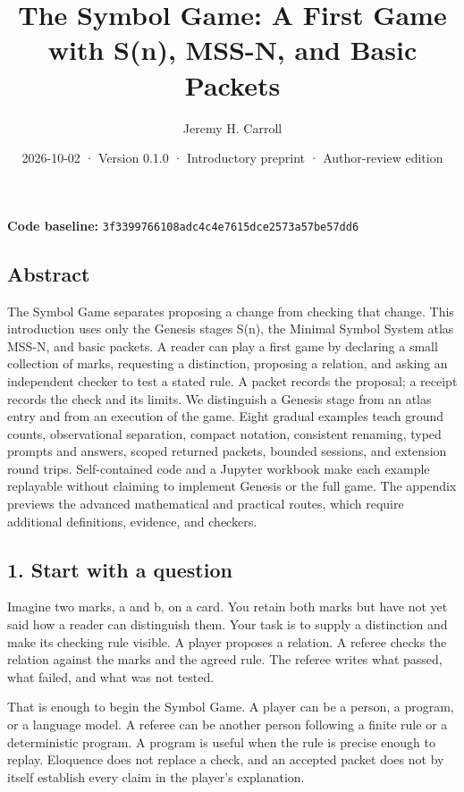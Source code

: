 \documentclass[
  11pt,
]{article}
\title{The Symbol Game: A First Game with S(n), MSS-N, and Basic
Packets}
\author{Jeremy H. Carroll}
\date{2026-10-02 · Version 0.1.0 · Introductory preprint · Author-review
edition}
\begin{document}
\makeatletter
\begin{center}
{\LARGE \@title\par}
\vspace{0.8em}
{\normalsize \@author\par}
\vspace{0.5em}
{\small \@date\par}
\end{center}
\makeatother

\textbf{Code baseline:}
\nolinkurl{3f3399766108adc4c4e7615dce2573a57be57dd6}

\subsection{Abstract}\label{abstract}

The Symbol Game separates proposing a change from checking that change.
This introduction uses only the Genesis stages S(n), the Minimal Symbol
System atlas MSS-N, and basic packets. A reader can play a first game by
declaring a small collection of marks, requesting a distinction,
proposing a relation, and asking an independent checker to test a stated
rule. A packet records the proposal; a receipt records the check and its
limits. We distinguish a Genesis stage from an atlas entry and from an
execution of the game. Eight gradual examples teach ground counts,
observational separation, compact notation, consistent renaming, typed
prompts and answers, scoped returned packets, bounded sessions, and
extension round trips. Self-contained code and a Jupyter workbook make
each example replayable without claiming to implement Genesis or the
full game. The appendix previews the advanced mathematical and practical
routes, which require additional definitions, evidence, and checkers.

\subsection{1. Start with a question}\label{start-with-a-question}

Imagine two marks, a and b, on a card. You retain both marks but have
not yet said how a reader can distinguish them. Your task is to supply a
distinction and make its checking rule visible. A player proposes a
relation. A referee checks the relation against the marks and the agreed
rule. The referee writes what passed, what failed, and what was not
tested.

That is enough to begin the Symbol Game. A player can be a person, a
program, or a language model. A referee can be another person following
a finite rule or a deterministic program. A program is useful when the
rule is precise enough to replay. Eloquence does not replace a check,
and an accepted packet does not by itself establish every claim in the
player's explanation.
\end{document}
